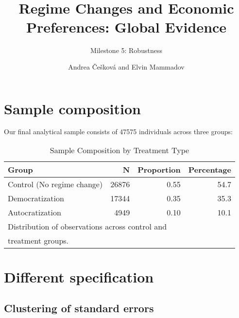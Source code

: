 \documentclass[
  letterpaper,
  DIV=11,
  numbers=noendperiod]{scrartcl}
\title{Regime Changes and Economic Preferences: Global Evidence}
\subtitle{Milestone 5: Robustness}
\author{Andrea Češková and Elvin Mammadov}
\date{}
\renewcommand*\contentsname{Table of contents}
\newcommand\contentsname{Table of contents}
\begin{document}
\maketitle
\ifdefined\Shaded\renewenvironment{Shaded}{\begin{tcolorbox}[borderline west={3pt}{0pt}{shadecolor}, breakable, frame hidden, interior hidden, enhanced, boxrule=0pt, sharp corners]}{\end{tcolorbox}}\fi

\renewcommand*\contentsname{Table of contents}
{
\hypersetup{linkcolor=}
\setcounter{tocdepth}{3}
\tableofcontents
}
\hypertarget{sample-composition}{%
\section{Sample composition}\label{sample-composition}}

Our final analytical sample consists of 47575 individuals across three
groups:

\hypertarget{tbl-samplecomp}{}
\begin{table}
\caption{\label{tbl-samplecomp}Sample Composition by Treatment Type }\tabularnewline

\centering
\begin{tabular}{l|r|r|r}
\hline
Group & N & Proportion & Percentage\\
\hline
Control (No regime change) & 26876 & 0.55 & 54.7\\
\hline
Democratization & 17344 & 0.35 & 35.3\\
\hline
Autocratization & 4949 & 0.10 & 10.1\\
\hline
\multicolumn{4}{l}{\textsuperscript{} Distribution of observations across control and}\\
\multicolumn{4}{l}{treatment groups.}\\
\end{tabular}
\end{table}

\hypertarget{different-specification}{%
\section{Different specification}\label{different-specification}}

\hypertarget{clustering-of-standard-errors}{%
\subsection{Clustering of standard
errors}\label{clustering-of-standard-errors}}
\end{document}
